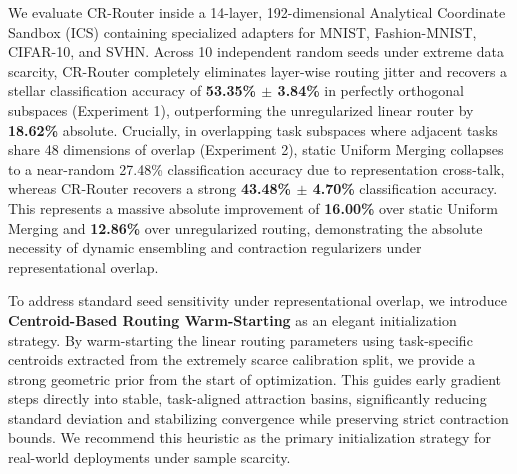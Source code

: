 We evaluate CR-Router inside a 14-layer, 192-dimensional Analytical Coordinate Sandbox (ICS) \cite{sable2025samplewise} containing specialized adapters for MNIST, Fashion-MNIST, CIFAR-10, and SVHN. Across 10 independent random seeds under extreme data scarcity, CR-Router completely eliminates layer-wise routing jitter and recovers a stellar classification accuracy of \textbf{53.35\% $\pm$ 3.84\%} in perfectly orthogonal subspaces (Experiment 1), outperforming the unregularized linear router by \textbf{18.62\%} absolute. Crucially, in overlapping task subspaces where adjacent tasks share 48 dimensions of overlap (Experiment 2), static Uniform Merging collapses to a near-random 27.48\% classification accuracy due to representation cross-talk, whereas CR-Router recovers a strong \textbf{43.48\% $\pm$ 4.70\%} classification accuracy. This represents a massive absolute improvement of \textbf{16.00\%} over static Uniform Merging and \textbf{12.86\%} over unregularized routing, demonstrating the absolute necessity of dynamic ensembling and contraction regularizers under representational overlap.

To address standard seed sensitivity under representational overlap, we introduce \textbf{Centroid-Based Routing Warm-Starting} as an elegant initialization strategy. By warm-starting the linear routing parameters using task-specific centroids extracted from the extremely scarce calibration split, we provide a strong geometric prior from the start of optimization. This guides early gradient steps directly into stable, task-aligned attraction basins, significantly reducing standard deviation and stabilizing convergence while preserving strict contraction bounds. We recommend this heuristic as the primary initialization strategy for real-world deployments under sample scarcity.


